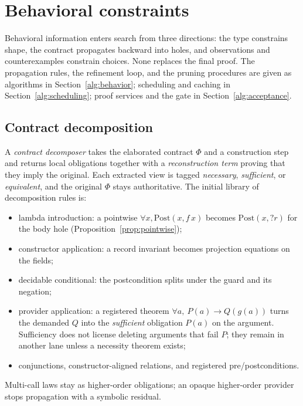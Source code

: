 \section{Behavioral constraints}\label{sec:behavior}

Behavioral information enters search from three directions: the type constrains shape, the contract propagates backward into holes, and observations and counterexamples constrain choices. None replaces the final proof. The propagation rules, the refinement loop, and the pruning procedures are given as algorithms in Section~\ref{alg:behavior}; scheduling and caching in Section~\ref{alg:scheduling}; proof services and the gate in Section~\ref{alg:acceptance}.

\subsection{Contract decomposition}

A \emph{contract decomposer} takes the elaborated contract $\Phi$ and a construction step and returns local obligations together with a \emph{reconstruction term} proving that they imply the original. Each extracted view is tagged \emph{necessary}, \emph{sufficient}, or \emph{equivalent}, and the original $\Phi$ stays authoritative. The initial library of decomposition rules is:
\begin{itemize}
\item lambda introduction: a pointwise $\forall x, \mathrm{Post}(x, f\,x)$ becomes $\mathrm{Post}(x, ?r)$ for the body hole (Proposition~\ref{prop:pointwise});
\item constructor application: a record invariant becomes projection equations on the fields;
\item decidable conditional: the postcondition splits under the guard and its negation;
\item provider application: a registered theorem $\forall a,\ P(a) \to Q(g(a))$ turns the demanded $Q$ into the \emph{sufficient} obligation $P(a)$ on the argument. Sufficiency does not license deleting arguments that fail $P$; they remain in another lane unless a necessity theorem exists;
\item conjunctions, constructor-aligned relations, and registered pre/postconditions.
\end{itemize}
Multi-call laws stay as higher-order obligations; an opaque higher-order provider stops propagation with a symbolic residual.

